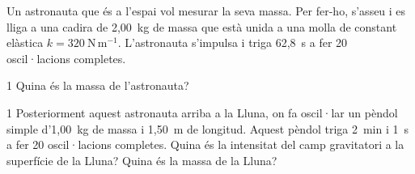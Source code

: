 Un astronauta que és a l'espai vol mesurar la seva massa. Per fer-ho, s'asseu i es lliga a una cadira de 2,00~kg de massa que està unida a una molla de constant elàstica $k = 320\ \mathrm{N\,m^{-1}}$. L'astronauta s'impulsa i triga 62,8~s a fer 20 oscil·lacions completes.

\begin{apartat}{1}
Quina és la massa de l'astronauta?
\end{apartat}

\begin{apartat}{1}
Posteriorment aquest astronauta arriba a la Lluna, on fa oscil·lar un pèndol simple d'1,00~kg de massa i 1,50~m de longitud. Aquest pèndol triga 2~min i 1~s a fer 20 oscil·lacions completes. Quina és la intensitat del camp gravitatori a la superfície de la Lluna? Quina és la massa de la Lluna?
\end{apartat}

